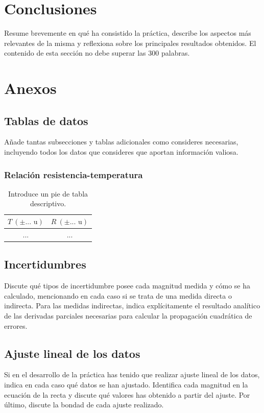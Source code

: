 \section{Conclusiones}

Resume brevemente en qué ha consistido la práctica, describe los aspectos más relevantes de la misma y reflexiona sobre los principales resultados obtenidos. El contenido de esta sección no debe superar las 300 palabras.

\appendix

\section{Anexos}

\subsection{Tablas de datos}

Añade tantas subsecciones y tablas adicionales como consideres necesarias, incluyendo todos los datos que consideres que aportan información valiosa.

\newpage %

\subsubsection{Relación resistencia-temperatura}

\begin{table}[ht!]
    \centering
    \begin{tabular}{c|c}
    $T\ (\pm ...\text{ u})$ & $R\ (\pm ...\text{ u})$\\
    \hline
    ... & ... \\
    \hline
    \end{tabular}
    \caption{Introduce un pie de tabla descriptivo.}
    \label{tab:T-R}
\end{table}

\subsection{Incertidumbres}

Discute qué tipos de incertidumbre posee cada magnitud medida y cómo se ha calculado, mencionando en cada caso si se trata de una medida directa o indirecta. Para las medidas indirectas, indica explícitamente el resultado analítico de las derivadas parciales necesarias para calcular la propagación cuadrática de errores.

\subsection{Ajuste lineal de los datos}

Si en el desarrollo de la práctica has tenido que realizar ajuste lineal de los datos, indica en cada caso qué datos se han ajustado. Identifica cada magnitud en la ecuación de la recta y discute qué valores has obtenido a partir del ajuste. Por último, discute la bondad de cada ajuste realizado.

\printbibliography